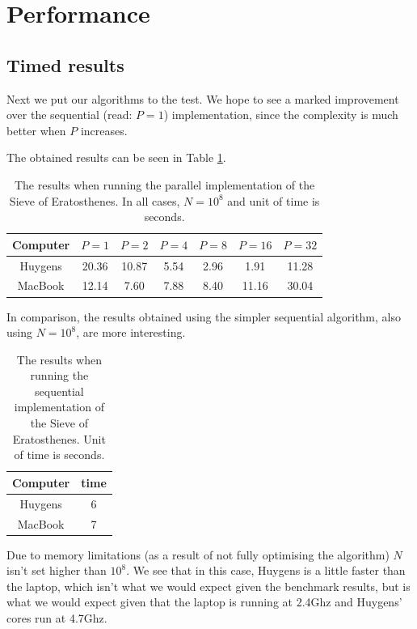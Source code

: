 \documentclass[a4paper]{article}
\begin{document}
\section{Performance}

\subsection{Timed results}
Next we put our algorithms to the test. We hope to see a marked improvement over
the sequential (read: $P=1$) implementation, since the complexity is much better
when $P$ increases. 

The obtained results can be seen in Table \ref{tbl:results}. 

\begin{table}
    \centering
    \begin{tabular}{c|cccccc}
        Computer & $P=1$ & $P=2$ & $P=4$& $P=8$& $P=16$& $P=32$    \\
        \hline
        Huygens & 20.36 & 10.87 & 5.54 & 2.96 & 1.91 & 11.28 \\
        MacBook & 12.14 &  7.60 & 7.88 & 8.40 &11.16 & 30.04 \\
        \hline
    \end{tabular}
    \caption{The results when running the parallel implementation of
    the Sieve of Eratosthenes. In all cases, $N=10^8$ and unit of time is
    seconds. }
    \label{tbl:results}
\end{table}

In comparison, the results obtained using the simpler sequential algorithm, also
using $N=10^8$, are more interesting. 

\begin{table}
    \centering
    \begin{tabular}{c|c}
        Computer & time   \\
        \hline
        Huygens & 6 \\
        MacBook & 7 \\
        \hline
    \end{tabular}
    \caption{The results when running the sequential implementation of
    the Sieve of Eratosthenes. Unit of time is
    seconds. }
    \label{tbl:resultsSeq}
\end{table}

Due to memory limitations (as a result of not fully optimising the algorithm)
$N$ isn't set higher than $10^8$. We see that in this case, Huygens is a little
faster than the laptop, which isn't what we would expect given the benchmark
results, but is what we would expect given that the laptop is running at 2.4Ghz
and Huygens' cores run at 4.7Ghz. 
\end{document}

